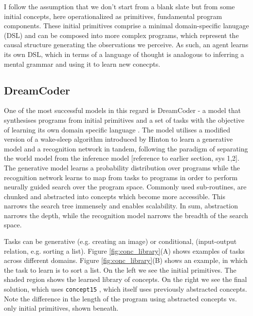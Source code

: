 I follow the assumption that we don't start from a blank slate but from some initial concepts, here operationalized as primitives, fundamental program components. These initial primitives comprise a minimal domain-specific lanugage (DSL) and can be composed into more complex programs, which represent the causal structure generating the observations we perceive. As such, an agent learns its own DSL, which in terms of a language of thought is analogous to inferring a mental grammar and using it to learn new conecpts.








\subsection{DreamCoder}

One of the most successful models in this regard is DreamCoder - a model that synthesises programs from initial primitives and a set of tasks with the objective of learning its own domain specific language \cite{ellis_dreamcoder_2021}. The model utilises a modified version of a wake-sleep algorithm introduced by Hinton to learn a generative model and a recognition network in tandem, following the paradigm of separating the world model from the inference model \cite{hinton1995wake} [reference to earlier section, sys 1,2]. The generative model learns a probability distribution over programs while the recognition network learns to map from tasks to programs in order to perform neurally guided search over the program space.
Commonly used sub-routines, are chunked and abstracted into concepts which become more accessible. This narrows the search tree immensely and enables scalability. In sum, abstraction narrows the depth, while the recognition model narrows the breadth of the search space.

Tasks can be generative (e.g. creating an image) or conditional, (input-output relation, e.g. sorting a list).
Figure \ref{fig:conc_library}(A) shows examples of tasks across different domains. 
Figure \ref{fig:conc_library}(B) shows an example, in which the task to learn is to sort a list. On the left we see the initial primitives. The shaded region shows the learned library of concepts. On the right we see the final solution, which uses \texttt{concept15} , which itself uses previously abstracted concepts. Note the difference in the length of the program using abstracted concepts vs. only initial primitives, shown beneath.

